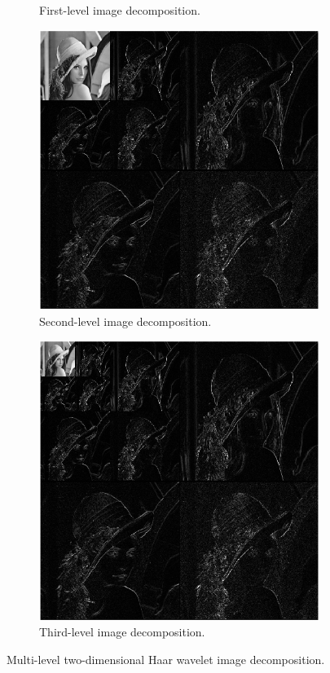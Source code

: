 \documentclass[12pt]{article}
\theoremstyle{definition}
\begin{document}
\begin{figure}
\begin{subfigure}{.48\textwidth}
      \caption{First-level image decomposition.}
      \label{fig:lena-dec-1}
    \end{subfigure}
    \begin{subfigure}{.48\textwidth}
      \includegraphics[width=.99\textwidth]{figs/lena-dec-2.png}
      \caption{Second-level image decomposition.}
      \label{fig:lena-dec-2}
    \end{subfigure}
    \begin{subfigure}{.48\textwidth}
      \includegraphics[width=.99\textwidth]{figs/lena-dec-3.png}
      \caption{Third-level image decomposition.}
      \label{fig:lena-dec-3}
    \end{subfigure}
    \caption{Multi-level two-dimensional Haar wavelet image decomposition.}
    \label{fig:lena-dec}
  \end{figure}
\end{document}
